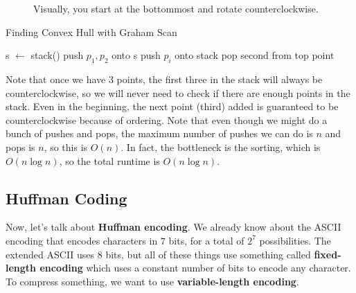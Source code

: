 \begin{example}
\begin{figure}[H]
      \caption{Visually, you start at the bottommost and rotate counterclockwise. } 
      \label{fig:graham}
    \end{figure}

    \begin{algorithm}[H]
      \caption{Finding Convex Hull with Graham Scan}
      \label{alg:graham}
      \begin{algorithmic}
          \State s $\gets$ stack()
          \State push $p_1, p_2$ onto s 
            \State push $p_i$ onto stack 
              \State pop second from top point 
            \EndWhile
          \EndFor 
          \State {} 
        \EndFunction
      \end{algorithmic}
    \end{algorithm}
    Note that once we have 3 points, the first three in the stack will always be counterclockwise, so we will never need to check if there are enough points in the stack. Even in the beginning, the next point (third) added is guaranteed to be counterclockwise because of ordering. Note that even though we might do a bunch of pushes and pops, the maximum number of pushes we can do is $n$ and pops is $n$, so this is $O(n)$. In fact, the bottleneck is the sorting, which is $O(n \log{n})$, so the total runtime is $O(n \log{n})$. 
  \end{example}

\subsection{Huffman Coding}

  Now, let's talk about \textbf{Huffman encoding}. We already know about the ASCII encoding that encodes characters in $7$ bits, for a total of $2^7$ possibilities. The extended ASCII uses $8$ bits, but all of these things use something called \textbf{fixed-length encoding} which uses a constant number of bits to encode any character. To compress something, we want to use \textbf{variable-length encoding}. 

